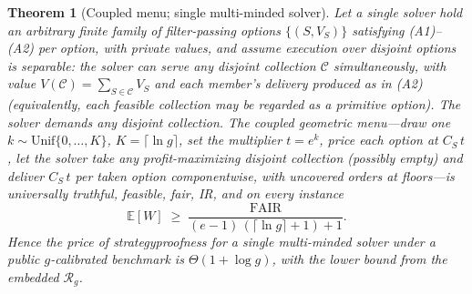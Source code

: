 \documentclass[11pt]{article}
\newtheorem{theorem}{Theorem}
\theoremstyle{remark}
\newcommand{\FAIR}{\mathrm{FAIR}}
\newcommand{\E}{\mathbb{E}}
\begin{document}
\begin{theorem}[Coupled menu; single multi-minded solver]
\label{thm:coupled}
Let a single solver hold an arbitrary finite family of filter-passing
options $\{(S,V_S)\}$ satisfying (A1)--(A2) per option, with private
values, and assume execution over disjoint options is \emph{separable}:
the solver can serve any disjoint collection $\mathcal C$ simultaneously,
with value $V(\mathcal C)=\sum_{S\in\mathcal C}V_S$ and each member's
delivery produced as in (A2) (equivalently, each feasible collection may
be regarded as a primitive option). The solver demands any disjoint
collection. The coupled
geometric menu---draw one $k\sim\mathrm{Unif}\{0,\dots,K\}$,
$K=\lceil\ln g\rceil$, set the multiplier $t=e^k$, price each option at
$C_S\,t$, let the solver take any profit-maximizing disjoint collection
(possibly empty) and deliver $C_S\,t$ per taken option componentwise, with
uncovered orders at floors---is universally truthful, feasible, fair, IR,
and on every instance
\[
\E[W]\;\ge\;\frac{\FAIR}{(e-1)\,(\lceil\ln g\rceil+1)+1}.
\]
Hence the price of strategyproofness for a single multi-minded solver
under a public $g$-calibrated benchmark is $\Theta(1+\log g)$, with the
lower bound from the embedded $\mathcal R_g$.
\end{theorem}
\end{document}
